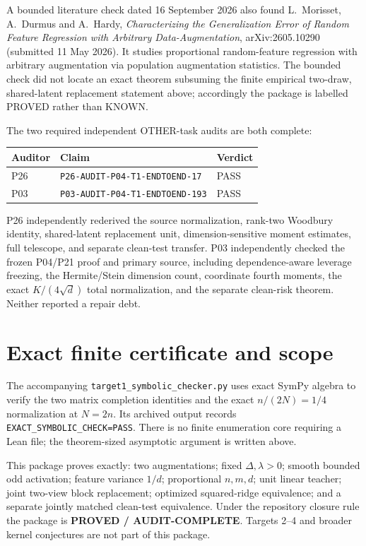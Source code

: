 \documentclass[11pt]{article}
\begin{document}
A bounded literature check dated 16 September 2026 also found L.~Morisset, A.~Durmus and A.~Hardy, \emph{Characterizing the Generalization Error of Random Feature Regression with Arbitrary Data-Augmentation}, arXiv:2605.10290 (submitted 11 May 2026).  It studies proportional random-feature regression with arbitrary augmentation via population augmentation statistics.  The bounded check did not locate an exact theorem subsuming the finite empirical two-draw, shared-latent replacement statement above; accordingly the package is labelled PROVED rather than KNOWN.

The two required independent OTHER-task audits are both complete:
\begin{center}
\begin{tabular}{lll}
\toprule
Auditor & Claim & Verdict\\
\midrule
P26 & \texttt{P26-AUDIT-P04-T1-ENDTOEND-17} & PASS\\
P03 & \texttt{P03-AUDIT-P04-T1-ENDTOEND-193} & PASS\\
\bottomrule
\end{tabular}
\end{center}
P26 independently rederived the source normalization, rank-two Woodbury identity, shared-latent replacement unit, dimension-sensitive moment estimates, full telescope, and separate clean-test transfer.  P03 independently checked the frozen P04/P21 proof and primary source, including dependence-aware leverage freezing, the Hermite/Stein dimension count, coordinate fourth moments, the exact \(K/(4\sqrt d)\) total normalization, and the separate clean-risk theorem.  Neither reported a repair debt.

\section{Exact finite certificate and scope}
The accompanying \texttt{target1\_symbolic\_checker.py} uses exact SymPy algebra to verify the two matrix completion identities and the exact \(n/(2N)=1/4\) normalization at \(N=2n\).  Its archived output records \texttt{EXACT\_SYMBOLIC\_CHECK=PASS}.  There is no finite enumeration core requiring a Lean file; the theorem-sized asymptotic argument is written above.

This package proves exactly: two augmentations; fixed \(\Delta,\lambda>0\); smooth bounded odd activation; feature variance \(1/d\); proportional \(n,m,d\); unit linear teacher; joint two-view block replacement; optimized squared-ridge equivalence; and a separate jointly matched clean-test equivalence.  Under the repository closure rule the package is \textbf{PROVED / AUDIT-COMPLETE}.  Targets 2--4 and broader kernel conjectures are not part of this package.
\end{document}
